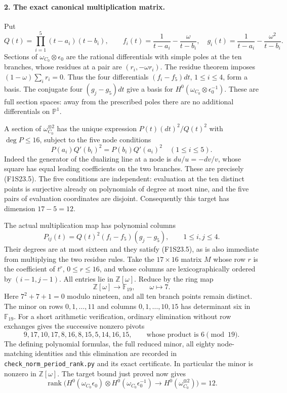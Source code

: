 \paragraph{2. The exact canonical multiplication matrix.}
Put
\[
 Q(t)=\prod_{i=1}^5(t-a_i)(t-b_i),\qquad
 f_i(t)=\frac1{t-a_i}-\frac{\omega}{t-b_i},\quad
 g_i(t)=\frac1{t-a_i}-\frac{\omega^2}{t-b_i}.
 \tag{F1S23.4}
\]
Sections of $\omega_{C_0}\otimes\epsilon_0$ are the rational
differentials with simple poles at the ten branches, whose residues
at a pair are $(r_i,-\omega r_i)$. The residue theorem imposes
$(1-\omega)\sum_i r_i=0$. Thus the four differentials
$(f_i-f_5)dt$, $1\le i\le4$, form a basis. The conjugate four
$(g_j-g_5)dt$ give a basis for
$H^0(\omega_{C_0}\otimes\epsilon_0^{-1})$.
These are full section spaces: away from the prescribed poles
there are no additional differentials on $\mathbb P^1$.

A section of $\omega_{C_0}^{\otimes2}$ has the unique expression
$P(t)(dt)^2/Q(t)^2$ with $\deg P\le16$, subject to the five
node conditions
\[
       P(a_i)Q'(b_i)^2=P(b_i)Q'(a_i)^2\quad(1\le i\le5).
 \tag{F1S23.5}
\]
Indeed the generator of the dualizing line at a node is
$du/u=-dv/v$, whose square has equal leading coefficients on
the two branches. These are precisely (F1S23.5).
The five conditions are independent: evaluation at the ten
distinct points is surjective already on polynomials of degree at
most nine, and the five pairs of evaluation coordinates are
disjoint. Consequently this target has dimension $17-5=12$.

The actual multiplication map has polynomial columns
\[
 P_{ij}(t)=Q(t)^2(f_i-f_5)(g_j-g_5),\qquad1\le i,j\le4.
 \tag{F1S23.6}
\]
Their degrees are at most sixteen and they satisfy (F1S23.5),
as is also immediate from multiplying the two residue rules.
Take the $17\times16$ matrix $M$ whose row $r$ is the coefficient
of $t^r$, $0\le r\le16$, and whose columns are lexicographically
ordered by $(i-1,j-1)$. All entries lie in $\mathbb Z[\omega]$.
Reduce by the ring map
\[
       \mathbb Z[\omega]\longrightarrow\mathbb F_{19},
                           \qquad\omega\longmapsto7.
 \tag{F1S23.7}
\]
Here $7^2+7+1=0$ modulo nineteen, and all ten branch points
remain distinct. The minor on rows $0,1,\ldots,11$ and columns
$0,1,\ldots,10,15$ has determinant six in $\mathbb F_{19}$.
For a short arithmetic verification, ordinary elimination without
row exchanges gives the successive nonzero pivots
\[
             9,17,10,17,8,16,8,15,5,14,16,15,
 \qquad\text{whose product is }6\pmod {19}.
 \tag{F1S23.8}
\]
The defining polynomial formulas, the full reduced minor, all
eighty node-matching identities and this elimination are recorded
in \texttt{check\_norm\_period\_rank.py} and its exact certificate.
In particular the minor is nonzero in $\mathbb Z[\omega]$.
The target bound just proved now gives
\[
 \operatorname{rank}\bigl(
 H^0(\omega_{C_0}\epsilon_0)\otimes
 H^0(\omega_{C_0}\epsilon_0^{-1})
                 \longrightarrow H^0(\omega_{C_0}^{\otimes2})\bigr)=12.
 \tag{F1S23.9}
\]

